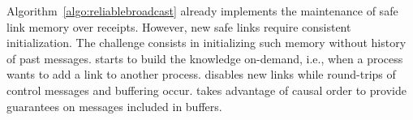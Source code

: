 Algorithm~\ref{algo:reliablebroadcast} already implements the maintenance of
safe link memory over receipts. However, new safe links require consistent
initialization. The challenge consists in initializing such memory without
history of past messages. \RPCBROADCAST starts to build the knowledge on-demand,
i.e., when a process wants to add a link to another process. \RPCBROADCAST
disables new links while round-trips of control messages and buffering occur.
\RPCBROADCAST takes advantage of causal order to provide guarantees on messages
included in buffers.





